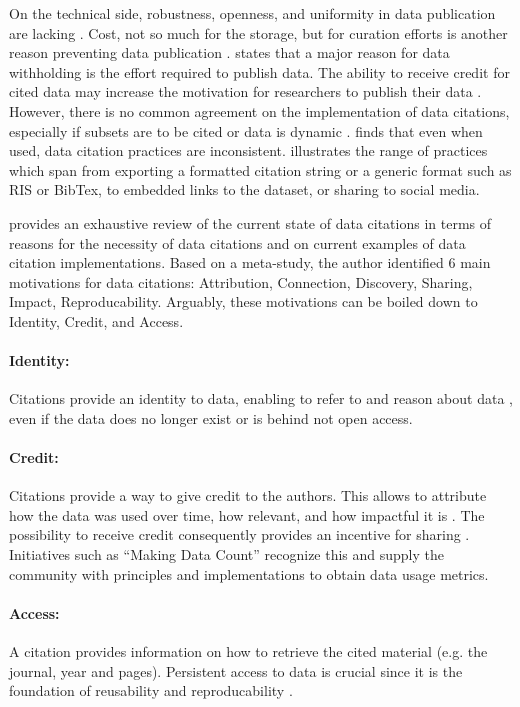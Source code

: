\documentclass[a4paper,10pt]{article}
\begin{document}
On the technical side, robustness, openness, and uniformity in data publication are lacking \citep{Starr2015, Koltay2016}. Cost, not so much for the storage, but for curation efforts is another reason preventing data publication \citep{Gray2002}.
\citep{Tenopir2011} states that a major reason for data withholding is the effort required to publish data. 
The ability to receive credit for cited data may increase the motivation for researchers to publish their data \citep{Crosas2011, AltKin07}. However, there is no common agreement on the implementation of data citations, especially if subsets are to be cited or data is dynamic \citep{Kratz2014, Assante2016}. \citep{Belter2014} finds that even when used, data citation practices are inconsistent. \citep{Assante2016} illustrates the range of practices which span from exporting a formatted citation string or a generic format such as RIS or BibTex, to embedded links to the dataset, or sharing to social media. 

\citep{Silvello2017} provides an exhaustive review of the current state of data citations in terms of reasons for the necessity of data citations and on current examples of data citation implementations. Based on a meta-study, the author identified 6 main motivations for data citations: Attribution, Connection, Discovery, Sharing, Impact, Reproducability. 
Arguably, these motivations can be boiled down to Identity, Credit, and Access. 

\paragraph{Identity:} 
Citations provide an identity to data, enabling to refer to and reason about data \citep{Bandrowski2016}, even if the data does no longer exist or is behind not open access.

\paragraph{Credit:}
Citations provide a way to give credit to the authors. This allows to attribute how the data was used over time, how relevant, and how impactful it is \citep{Honor2016}. The possibility to receive credit consequently provides an incentive for sharing \citep{Niemeyer2016, Callaghan2012, Kratz2014}. Initiatives such as ``Making Data Count''\citep{Kratz2015} recognize this and supply the community with principles and implementations to obtain data usage metrics.

\paragraph{Access:} 
A citation provides information on how to retrieve the cited material (e.g. the journal, year and pages). Persistent access to data is crucial since it is the foundation of reusability and reproducability \citep{Starr2015}.
\end{document}

